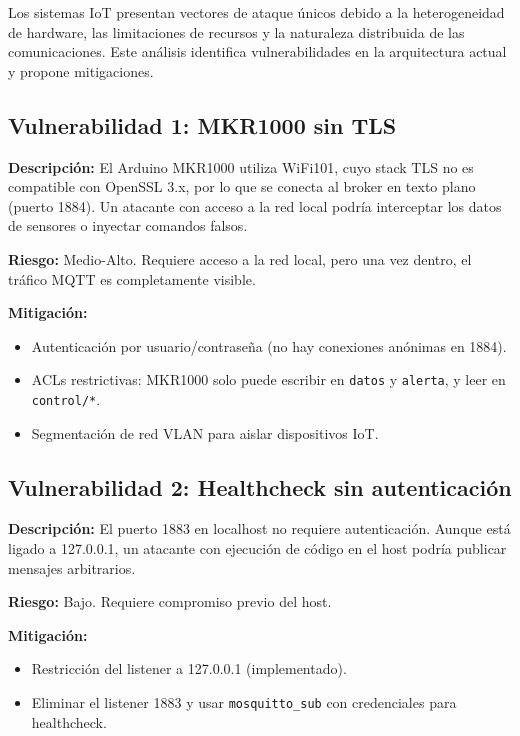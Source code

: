 \documentclass[12pt,letterpaper]{article}
\begin{document}
Los sistemas IoT presentan vectores de ataque únicos debido a la heterogeneidad de hardware, las limitaciones de recursos y la naturaleza distribuida de las comunicaciones. Este análisis identifica vulnerabilidades en la arquitectura actual y propone mitigaciones.

\subsection{Vulnerabilidad 1: MKR1000 sin TLS}

\textbf{Descripción:} El Arduino MKR1000 utiliza WiFi101, cuyo stack TLS no es compatible con OpenSSL 3.x, por lo que se conecta al broker en texto plano (puerto 1884). Un atacante con acceso a la red local podría interceptar los datos de sensores o inyectar comandos falsos.

\textbf{Riesgo:} Medio-Alto. Requiere acceso a la red local, pero una vez dentro, el tráfico MQTT es completamente visible.

\textbf{Mitigación:}
\begin{itemize}
    \item Autenticación por usuario/contraseña (no hay conexiones anónimas en 1884).
    \item ACLs restrictivas: MKR1000 solo puede escribir en \mbox{\texttt{datos}} y \mbox{\texttt{alerta}}, y leer en \mbox{\texttt{control/*}}.
    \item Segmentación de red VLAN para aislar dispositivos IoT.
\end{itemize}

\subsection{Vulnerabilidad 2: Healthcheck sin autenticación}

\textbf{Descripción:} El puerto 1883 en localhost no requiere autenticación. Aunque está ligado a 127.0.0.1, un atacante con ejecución de código en el host podría publicar mensajes arbitrarios.

\textbf{Riesgo:} Bajo. Requiere compromiso previo del host.

\textbf{Mitigación:}
\begin{itemize}
    \item Restricción del listener a 127.0.0.1 (implementado).
    \item Eliminar el listener 1883 y usar \mbox{\texttt{mosquitto\_sub}} con credenciales para healthcheck.
\end{itemize}
\end{document}
